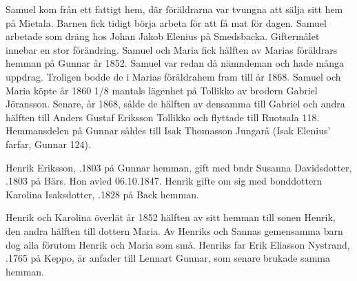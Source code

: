 Samuel kom från ett fattigt hem, där föräldrarna var tvungna att sälja sitt hem på Mietala. Barnen fick tidigt börja arbeta för att få mat för dagen. Samuel arbetade som dräng hos Johan Jakob Elenius på Smedsbacka.	Giftermålet innebar en stor förändring. Samuel och	Maria fick hälften av Marias föräldrars hemman på Gunnar år 1852. Samuel var redan då nämndeman och hade många uppdrag. Troligen bodde de i Marias föräldrahem fram till år 1868. Samuel och Maria köpte år 1860  1/8 mantals lägenhet på Tollikko av brodern Gabriel Jöransson. Senare, år 1868, sålde de hälften av densamma till 	Gabriel och andra hälften till Anders Gustaf Eriksson Tollikko och flyttade  till Ruotsala 118. Hemmansdelen på Gunnar såldes till Isak Thomasson Jungarå (Isak Elenius' farfar, Gunnar 124).


Henrik Eriksson, .1803 på Gunnar hemman, gift med bndr Susanna Davidsdotter, .1803 på Bärs. Hon avled 06.10.1847. Henrik gifte om sig med bonddottern Karolina Isaksdotter, .1828 på Back hemman.
\begin{jhchildren}
  \item {}
  \item {}
  \item {}
  \item {}
  \item {}
  \item {}
  \item {}
  \item {}
  \item {}
\end{jhchildren}

Henrik och Karolina överlät år 1852 hälften av sitt hemman till sonen Henrik, den andra hälften till dottern Maria. Av Henriks och Sannas gemensamma barn dog alla förutom Henrik och Maria som små. Henriks far Erik Eliasson Nystrand, .1765 på Keppo, är anfader till Lennart Gunnar, som senare brukade samma hemman.


